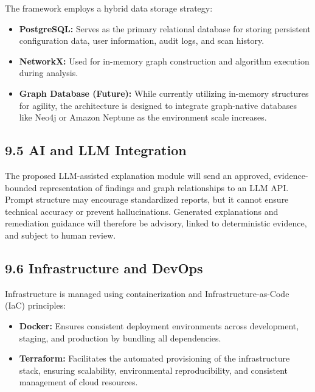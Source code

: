 The framework employs a hybrid data storage strategy:

\begin{itemize}
\tightlist
\item
  \textbf{PostgreSQL:} Serves as the primary relational database for storing persistent configuration data, user information, audit logs, and scan history.\\
\item
  \textbf{NetworkX:} Used for in-memory graph construction and algorithm execution during analysis.\\
\item
  \textbf{Graph Database (Future):} While currently utilizing in-memory structures for agility, the architecture is designed to integrate graph-native databases like Neo4j or Amazon Neptune as the environment scale increases.
\end{itemize}

\subsection{9.5 AI and LLM Integration}

The proposed LLM-assisted explanation module will send an approved, evidence-bounded representation of findings and graph relationships to an LLM API. Prompt structure may encourage standardized reports, but it cannot ensure technical accuracy or prevent hallucinations. Generated explanations and remediation guidance will therefore be advisory, linked to deterministic evidence, and subject to human review.

\subsection{9.6 Infrastructure and DevOps}

Infrastructure is managed using containerization and Infrastructure-as-Code (IaC) principles:

\begin{itemize}
\tightlist
\item
  \textbf{Docker:} Ensures consistent deployment environments across development, staging, and production by bundling all dependencies.\\
\item
  \textbf{Terraform:} Facilitates the automated provisioning of the infrastructure stack, ensuring scalability, environmental reproducibility, and consistent management of cloud resources.
\end{itemize}

